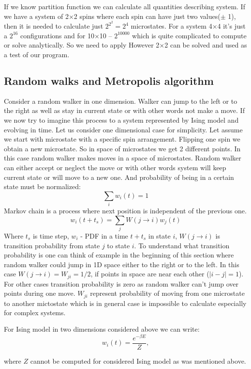 \documentclass[10pt]{article}
\begin{document}
If we know partition function we can calculate all quantities describing system. If we have a system of 2$\times$2 spins where each spin can have just two values($\pm$ 1), then it is needed to calculate just $2^{2^{2}} = 2^4$ microstates. For a system 4$\times$4 it's just a $2^{16}$ configurations and for 10$\times$10 -- $2^{10000}$ which is quite complicated to compute or solve analytically. So we need to apply
However 2$\times$2 can be solved and used as a test of our program.



\subsection{Random walks and Metropolis algorithm}
Consider a random walker in one dimension. Walker can jump to the left or to the right as well as stay in current state or with other words not make a move. If we now try to imagine this process to a system represented by Ising model and evolving in time. Let us consider one dimensional case for simplicity.
Let assume we start with microstate with a specific spin arrangement. Flipping one spin we obtain a new microstate. So in space of microstates we get 2 different points.
In this case random walker makes moves in a space of microstates.
Random walker can either accept or neglect the move or with other words system will keep
current state or will move to a new one. And probability of being in a certain state must be normalized:
\[
\sum_{i} {w_i(t)} = 1
\]
Markov chain is a process where next position is independent of the previous one.
\[
w_i(t+t_s)=\sum_{j} {W(j\rightarrow i)w_j(t)}
\]
Where $t_s$ is time step, $w_i$ - PDF in a time $t+t_s$ in state $i$, $W(j\rightarrow i)$ is transition probability from state $j$ to state $i$. To understand what transition probability is one can think of example in the beginning of this section where random walker could jump in 1D space either to the right or to the left. In this case
$W(j\rightarrow i)=W_{ji}=1/2$, if points in space are near each other ($|i-j|=1$). For other cases transition probability is zero as random walker can't jump over points during one move.
$W_{ji}$ represent probability of moving from one microstate to another mictostate which is in general case is impossible to calculate especially for complex systems.


For Ising model in two dimensions considered above we can write:
\[
w_i(t) = \frac{e^{-\beta E}}{Z},
\]

where $Z$ cannot be computed for considered Ising model as was mentioned above.
\end{document}
